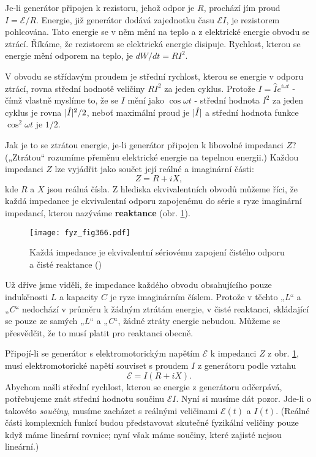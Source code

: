 {  Je-li generátor připojen k rezistoru, jehož odpor je \(R\), prochází jím proud 
  \(I=\mathscr{E}/R\). Energie, již generátor dodává zajednotku času \(\mathscr{E}I\), je 
  rezistorem pohlcována. Tato energie se v něm mění na teplo a z elektrické energie obvodu se 
  ztrácí. Říkáme, že rezistorem se elektrická energie disipuje. Rychlost, kterou se energie mění 
  odporem na teplo, je \(dW/dt = RI^2\).
  
  V obvodu se střídavým proudem je střední rychlost, kterou se energie v odporu ztrácí, rovna 
  střední hodnotě veličiny \(RI^2\) za jeden cyklus. Protože \(I= \hat{I}e^{i\omega t}\) - čímž 
  vlastně myslíme to, že se \(I\) mění jako \(\cos\omega t\) - střední hodnota \(I^2\) za jeden 
  cyklus je rovna \(\lvert\hat{I}\rvert^2/2\), neboť maximální proud je \(\lvert\hat{I}\rvert\) a střední 
  hodnota funkce \(\cos^2\omega t\) je \(1/2\).
  
  Jak je to se ztrátou energie, je-li generátor připojen k libovolné impedanci \(Z\)? („Ztrátou“ 
  rozumíme přeměnu elektrické energie na tepelnou energii.) Každou impedanci \(Z\) lze vyjádřit 
  jako součet její reálné a imaginární části:
  \begin{equation}\label{fyz:eq492}
    Z = R + iX,
  \end{equation}
  kde \(R\) a \(X\) jsou reálná čísla. Z hlediska ekvivalentních obvodů můžeme říci, že každá 
  impedance je ekvivalentní odporu zapojenému do série s ryze imaginární impedancí, kterou nazýváme 
  \textbf{reaktance} (obr. \ref{fyz:fig366}).
  
  \begin{figure}[ht!] %
    \centering
    \texttt{[image: fyz\_fig366.pdf]}
    \caption{Každá impedance je ekvivalentní sériovému zapojení čistého odporu a čisté reaktance
             (\cite[s.~406]{Feynman02})}
    \label{fyz:fig366}
  \end{figure}
  
  Už dříve jsme viděli, že impedance každého obvodu obsahujícího pouze indukčnosti \(L\) a kapacity 
  \(C\) je ryze imaginárním číslem. Protože v těchto „\emph{L}“ a „\emph{C}“ nedochází v průměru k 
  žádným ztrátám energie, v čisté reaktanci, skládající se pouze ze samých „\emph{L}“ a „\emph{C}“, 
  žádné ztráty energie nebudou. Můžeme se přesvědčit, že to musí platit pro reaktanci obecně.
  
  Připojí-li se generátor s elektromotorickým napětím \(\mathscr{E}\) k impedanci \(Z\) z obr. 
  \ref{fyz:fig366}, musí elektromotorické napětí souviset s proudem \(I\) z generátoru podle vztahu
  \begin{equation}\label{fyz:eq493}
    \mathscr{E} = I(R + iX). 
  \end{equation}
  Abychom našli střední rychlost, kterou se energie z generátoru odčerpává, potřebujeme znát 
  střední hodnotu součinu \(\mathscr{E}I\). Nyní si musíme dát pozor. Jde-li o takovéto 
  \emph{součiny}, musíme zacházet s reálnými veličinami \(\mathscr{E}(t)\) a \(I(t)\). (Reálné 
  části komplexních funkcí budou představovat skutečné fyzikální veličiny pouze když máme lineární 
  rovnice; nyní však máme součiny, které zajisté nejsou lineární.)
  
}
